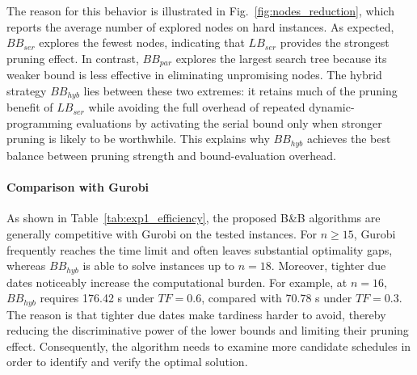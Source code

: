 \documentclass[letterpaper, 10 pt, conference]{ieeeconf}  %
\begin{document}
The reason for this behavior is illustrated in Fig.~\ref{fig:nodes_reduction}, which reports the average number of explored nodes on hard instances. As expected, $BB_{ser}$ explores the fewest nodes, indicating that $LB_{ser}$ provides the strongest pruning effect. In contrast, $BB_{par}$ explores the largest search tree because its weaker bound is less effective in eliminating unpromising nodes. The hybrid strategy $BB_{hyb}$ lies between these two extremes: it retains much of the pruning benefit of $LB_{ser}$ while avoiding the full overhead of repeated dynamic-programming evaluations by activating the serial bound only when stronger pruning is likely to be worthwhile. This explains why $BB_{hyb}$ achieves the best balance between pruning strength and bound-evaluation overhead.

\paragraph{Comparison with Gurobi}

As shown in Table~\ref{tab:exp1_efficiency}, the proposed B\&B algorithms are generally competitive with Gurobi on the tested instances. For $n \geq 15$, Gurobi frequently reaches the time limit and often leaves substantial optimality gaps, whereas $BB_{hyb}$ is able to solve instances up to $n=18$. Moreover, tighter due dates noticeably increase the computational burden. For example, at $n=16$, $BB_{hyb}$ requires 176.42 s under $TF=0.6$, compared with 70.78 s under $TF=0.3$. The reason is that tighter due dates make tardiness harder to avoid, thereby reducing the discriminative power of the lower bounds and limiting their pruning effect. Consequently, the algorithm needs to examine more candidate schedules in order to identify and verify the optimal solution.
\end{document}
